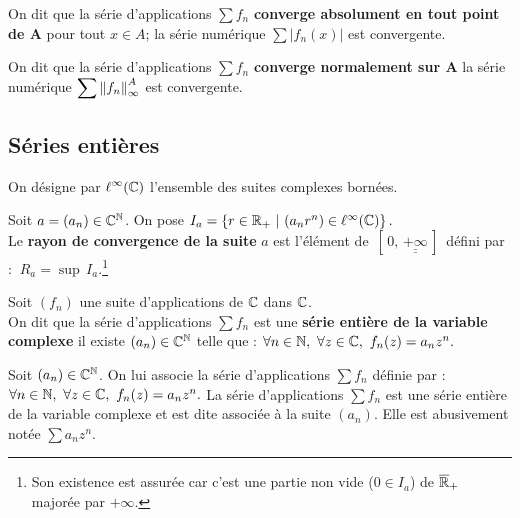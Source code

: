 \newpage

On dit que la série d'applications \(\sum f_n\) \textbf{converge absolument en tout point de A} \ssi pour tout \( x\in A\); la série numérique \(\displaystyle \sum |f_n(x)|\) est convergente.

\vspace{1.3cm}

On dit que la série d'applications \(\sum f_n\) \textbf{converge normalement sur A} \ssi la série numérique \(\displaystyle \sum \left\lVert f_n\right\rVert_\infty^A\) est convergente.

\vspace{2cm}

\subsection{Séries entières}

\vspace{0.8cm}
\begin{center}
On désigne par \(\displaystyle\ell^\infty(\mathbb{C})\) l'ensemble des suites complexes bornées.
\end{center}
\vspace{0.7cm}

Soit \(a=(a_n)\in \mathbb{C}^{\mathbb{N}}\). On pose \(I_a=\left\{ r\in \mathbb{R}_+ \ | \ (a_nr^n)\in \ell^\infty(\mathbb{C}) \right\}. \)\vspace{0.2cm}\\
Le \textbf{rayon de convergence de la suite} \(a\) est l'élément de \(\,[\,0,\,\underline{\underline{+\infty} } \,]\,\) défini par : \(\ R_a= \sup\, I_a.\)\footnote{Son existence est assurée car c'est une partie non vide (\(0\in I_a\)) de \(\overline{\mathbb{R}}_+\) majorée par \(+\infty\).}

\vspace{1.4cm}

Soit \((f_n)\) une suite d'applications de \(\mathbb{C}\) dans \(\mathbb{C}\).\vspace{0.2cm}\\
On dit que la série d'applications \(\sum f_n\) est une \textbf{série entière de la variable complexe} \ssi il existe \((a_n)\in \mathbb{C}^{\mathbb{N}} \) telle que : \(\forall n\in \NN,\ \forall z\in \CC,\ f_n(z)=a_nz^n.  \)\vspace{0.2cm}\\
\begin{small}
    Soit \((a_n)\in \mathbb{C}^{\mathbb{N}}\). On lui associe la série d'applications \(\sum f_n\) définie par : \(\forall n \in \NN,\ \forall z\in \CC, \ f_n(z)=a_nz^n.\) La série d'applications \(\sum f_n\) est une série entière de la variable complexe et est dite associée à la suite \((a_n)\). Elle est abusivement notée \(\sum a_nz^n\).    
\end{small}

